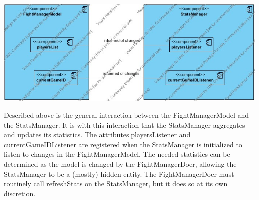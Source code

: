 \documentclass[12pt]{article}
\begin{document}
			\begin{center}
				\includegraphics[width=\textwidth]{Diagrams/Structure Diagrams/ComponentDiagram2.jpg}
			\end{center}
			Described above is the general interaction between the FightManagerModel and the StatsManager. It is with this interaction that the StatsManager aggregates and updates its statistics. The attributes playersListener and currentGameIDListener are registered when the StatsManager is initialized to listen to changes in the FightManagerModel. The needed statistics can be determined as the model is changed by the FightManagerDoer, allowing the StatsManager to be a (mostly) hidden entity. The FightManagerDoer must routinely call refreshStats on the StatsManager, but it does so at its own discretion.
\end{document}
